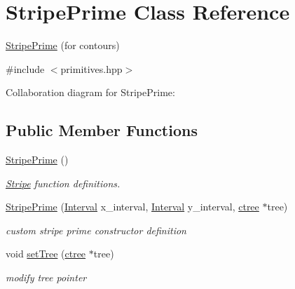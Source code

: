 \hypertarget{classStripePrime}{}\section{Stripe\+Prime Class Reference}
\label{classStripePrime}


\hyperlink{classStripePrime}{Stripe\+Prime} (for contours)  




{\ttfamily \#include $<$primitives.\+hpp$>$}



Collaboration diagram for Stripe\+Prime\+:
\subsection*{Public Member Functions}
\begin{DoxyCompactItemize}
\item 
\mbox{\label{classStripePrime_a79abcf0f9cc79fef795f1ee13b3841af}} 
\hyperlink{classStripePrime_a79abcf0f9cc79fef795f1ee13b3841af}{Stripe\+Prime} ()
\begin{DoxyCompactList}\small\item\em \hyperlink{classStripe}{Stripe} function definitions. \end{DoxyCompactList}\item 
\mbox{\label{classStripePrime_a0c745dcc08e46292689766e45e6c9e54}} 
\hyperlink{classStripePrime_a0c745dcc08e46292689766e45e6c9e54}{Stripe\+Prime} (\hyperlink{classInterval}{Interval} x\+\_\+interval, \hyperlink{classInterval}{Interval} y\+\_\+interval, \hyperlink{classctree}{ctree} $\ast$tree)
\begin{DoxyCompactList}\small\item\em custom stripe prime constructor definition \end{DoxyCompactList}\item 
\mbox{\label{classStripePrime_aee4fefcc9c3e850f73187d8aa859e658}} 
void \hyperlink{classStripePrime_aee4fefcc9c3e850f73187d8aa859e658}{set\+Tree} (\hyperlink{classctree}{ctree} $\ast$tree)
\begin{DoxyCompactList}\small\item\em modify tree pointer \end{DoxyCompactList}\item 
\mbox{\label{classStripePrime_af4886dd218f6d112979af84d1b3e12f6}} 

\end{DoxyCompactItemize}
